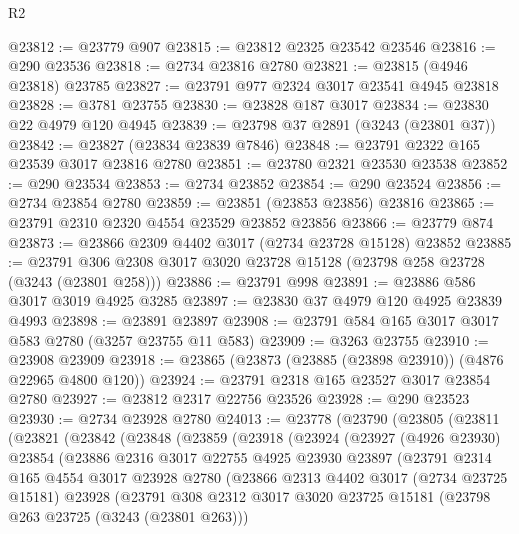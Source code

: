 \begin{lexlean}{R2}
\begin{coremodule}
@23812 := @23779 @907
@23815 := @23812 @2325 @23542 @23546
@23816 := @290 @23536
@23818 := @2734 @23816 @2780
@23821 := @23815 (@4946 @23818) @23785
@23827 := @23791 @977 @2324 @3017 @23541 @4945 @23818
@23828 := @3781 @23755
@23830 := @23828 @187 @3017
@23834 := @23830 @22 @4979 @120 @4945
@23839 := @23798 @37 @2891 (@3243 (@23801 @37))
@23842 := @23827 (@23834 @23839 @7846)
@23848 := @23791 @2322 @165 @23539 @3017 @23816 @2780
@23851 := @23780 @2321 @23530 @23538
@23852 := @290 @23534
@23853 := @2734 @23852
@23854 := @290 @23524
@23856 := @2734 @23854 @2780
@23859 := @23851 (@23853 @23856) @23816
@23865 := @23791 @2310 @2320 @4554 @23529 @23852 @23856
@23866 := @23779 @874
@23873 := @23866 @2309 @4402 @3017 (@2734 @23728 @15128) @23852
@23885 := @23791 @306 @2308 @3017 @3020 @23728 @15128 (@23798 @258 @23728 (@3243 (@23801 @258)))
@23886 := @23791 @998
@23891 := @23886 @586 @3017 @3019 @4925 @3285
@23897 := @23830 @37 @4979 @120 @4925 @23839 @4993
@23898 := @23891 @23897
@23908 := @23791 @584 @165 @3017 @3017 @583 @2780 (@3257 @23755 @11 @583)
@23909 := @3263 @23755
@23910 := @23908 @23909
@23918 := @23865 (@23873 (@23885 (@23898 @23910)) (@4876 @22965 @4800 @120))
@23924 := @23791 @2318 @165 @23527 @3017 @23854 @2780
@23927 := @23812 @2317 @22756 @23526
@23928 := @290 @23523
@23930 := @2734 @23928 @2780
@24013 := @23778
    (@23790
      (@23805
        (@23811
          (@23821
            (@23842
              (@23848
                (@23859
                  (@23918
                    (@23924
                      (@23927
                        (@4926 @23930)
                        @23854
                        (@23886
                          @2316
                          @3017
                          @22755
                          @4925
                          @23930
                          @23897
                          (@23791
                            @2314
                            @165
                            @4554
                            @3017
                            @23928
                            @2780
                            (@23866
                              @2313
                              @4402
                              @3017
                              (@2734 @23725 @15181)
                              @23928
                              (@23791
                                @308
                                @2312
                                @3017
                                @3020
                                @23725
                                @15181
                                (@23798 @263 @23725 (@3243 (@23801 @263)))

\end{coremodule}
\end{lexlean}
